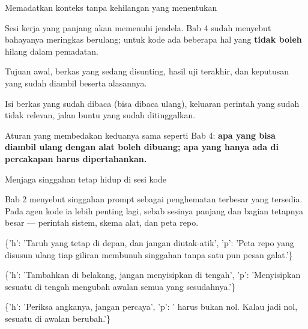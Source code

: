 \documentclass[aspectratio=169,11pt,t]{beamer}
\begin{document}
\begin{frame}[shrink=25]{Memadatkan konteks tanpa kehilangan yang menentukan}
{\fontsize{9.4}{12.6}\selectfont\color{fg2}Sesi kerja yang panjang akan memenuhi jendela. Bab 4 sudah menyebut bahayanya meringkas berulang; untuk kode ada beberapa hal yang \textbf{tidak boleh} hilang dalam pemadatan.\par}\vskip 4pt
\begin{minipage}[t]{0.494\textwidth}
\begin{icardgood}
Tujuan awal, berkas yang sedang disunting, hasil uji terakhir, dan keputusan yang sudah diambil beserta alasannya.
\end{icardgood}
\end{minipage}%
\hfill
\begin{minipage}[t]{0.494\textwidth}
\begin{icard}
Isi berkas yang sudah dibaca (bisa dibaca ulang), keluaran perintah yang sudah tidak relevan, jalan buntu yang sudah ditinggalkan.
\end{icard}
\end{minipage}%
\begin{iband}[signal]
Aturan yang membedakan keduanya sama seperti Bab 4: \textbf{apa yang bisa diambil ulang dengan alat boleh dibuang; apa yang hanya ada di percakapan harus dipertahankan.}
\end{iband}
\end{frame}

\begin{frame}[shrink=25]{Menjaga singgahan tetap hidup di sesi kode}
{\fontsize{9.4}{12.6}\selectfont\color{fg2}Bab 2 menyebut singgahan prompt sebagai penghematan terbesar yang tersedia. Pada agen kode ia lebih penting lagi, sebab sesinya panjang dan bagian tetapnya besar --- perintah sistem, skema alat, dan peta repo.\par}\vskip 4pt
\begin{isteps}
\item \{'h': 'Taruh yang tetap di depan, dan jangan diutak-atik', 'p': 'Peta repo yang disusun ulang tiap giliran membunuh singgahan tanpa satu pun pesan galat.'\}
\item \{'h': 'Tambahkan di belakang, jangan menyisipkan di tengah', 'p': 'Menyisipkan sesuatu di tengah mengubah awalan semua yang sesudahnya.'\}
\item \{'h': 'Periksa angkanya, jangan percaya', 'p': ' harus bukan nol. Kalau jadi nol, sesuatu di awalan berubah.'\}
\end{isteps}
\end{frame}
\end{document}
